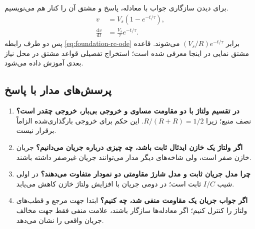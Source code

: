 برای دیدن سازگاری جواب با معادله، پاسخ و مشتق آن را کنار هم می‌نویسیم.
\[
 \begin{aligned}
 v&=V_s(1-e^{-t/\tau}),\\
 \frac{\mathrm{d}v}{\mathrm{d}t}&=\frac{V_s}{\tau}e^{-t/\tau}.
 \end{aligned}
\]
پس دو طرف رابطه \eqref{eq:foundation-rc-ode} برابر
\((V_s/R)e^{-t/\tau}\) می‌شوند. قاعده مشتق نمایی در اینجا معرفی شده است؛
استخراج تفصیلی قواعد مشتق در محل نیاز بعدی آموزش داده می‌شود.

\subsection{پرسش‌های مدار با پاسخ}
\begin{enumerate}
\item \textbf{در تقسیم ولتاژ با دو مقاومت مساوی و خروجی بی‌بار، خروجی چقدر است؟}
نصف منبع؛ زیرا \(R/(R+R)=1/2\). این حکم برای خروجی بارگذاری‌شده الزاماً برقرار نیست.
\item \textbf{اگر ولتاژ یک خازن ایدئال ثابت باشد، چه چیزی درباره جریان می‌دانیم؟}
جریان خازن صفر است، ولی شاخه‌های دیگر مدار می‌توانند جریان غیرصفر داشته باشند.
\item \textbf{چرا مدل جریان ثابت و مدل شارژ مقاومتی دو نمودار متفاوت می‌دهند؟}
در اولی شیب \(I/C\) ثابت است؛ در دومی جریان با افزایش ولتاژ خازن کاهش می‌یابد.
\item \textbf{اگر جواب جریان یک مقاومت منفی شد، چه کنیم؟}
ابتدا جهت مرجع و قطب‌های ولتاژ را کنترل کنیم؛ اگر معادله‌ها سازگار باشند،
علامت منفی فقط جهت مخالف جریان واقعی را نشان می‌دهد.
\end{enumerate}
